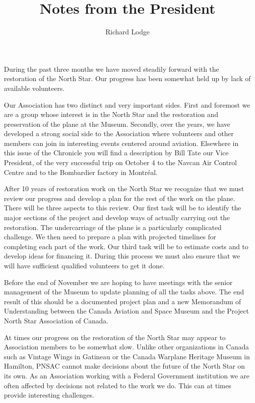 %


\title{Notes from the President}
\author{Richard Lodge}

\maketitle

During the past three months we have moved steadily forward with the
restoration of the North Star.  Our progress has been somewhat held up
by lack of available volunteers.

Our Association has two distinct and very important sides.  First and
foremost we are a group whose interest is in the North Star and the
restoration and preservation of the plane at the Museum.  Secondly,
over the years, we have developed a strong social side to the
Association where volunteers and other members can join in interesting
events centered around aviation. Elsewhere in this issue of the
Chronicle you will find a description by Bill Tate our Vice President,
of the very successful trip on October 4 to the Navcan Air Control
Centre and to the Bombardier factory in Montr\'{e}al.

After 10 years of restoration work on the North Star we recognize that
we must review our progress and develop a plan for the rest of the
work on the plane.  There will be three aspects to this review.  Our
first task will be to identify the major sections of the project and
develop ways of actually carrying out the restoration.  The
undercarriage of the plane is a particularly complicated challenge.
We then need to prepare a plan with projected timelines for completing
each part of the work.  Our third task will be to estimate costs and
to develop ideas for financing it.  During this process we must also
ensure that we will have sufficient qualified volunteers to get it
done.

Before the end of November we are hoping to have meetings with the
senior management of the Museum to update planning of all the tasks
above.  The end result of this should be a documented project plan and
a new Memorandum of Understanding between the Canada Aviation and
Space Museum and the Project North Star Association of Canada.

At times our progress on the restoration of the North Star may appear
to Association members to be somewhat slow.  Unlike other
organizations in Canada such as Vintage Wings in Gatineau or the
Canada Warplane Heritage Museum in Hamilton, PNSAC cannot make
decisions about the future of the North Star on its own.  As an
Association working with a Federal Government institution we are often
affected by decisions not related to the work we do.  This can at
times provide interesting challenges.


